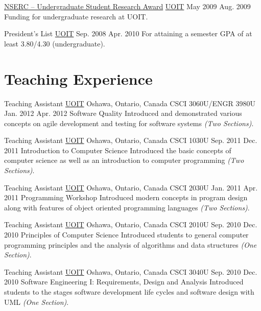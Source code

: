   \academicAwardsEntry
    {\href{http://www.nserc-crsng.gc.ca/students-etudiants/ug-pc/usra-brpc_eng.asp}{NSERC -- Undergraduate Student Research Award}}
    {\href{http://uoit.ca/}{UOIT}}
    {May 2009}
    {Aug. 2009}
    {Funding for undergraduate research at UOIT.}

  \academicAwardsEntry
    {President's List}
    {\href{http://uoit.ca/}{UOIT}}
    {Sep. 2008}
    {Apr. 2010}
    {For attaining a semester GPA of at least 3.80/4.30 (undergraduate).}

  \section{Teaching Experience}

  \teachingEntry
    {Teaching Assistant}
    {\href{http://www.uoit.ca/}{UOIT}}
    {Oshawa, Ontario, Canada}
    {CSCI 3060U/ENGR 3980U}
    {Jan. 2012}
    {Apr. 2012}
    {Software Quality}
    {Introduced and demonstrated various concepts on agile development and testing for software systems \textit{(Two Sections)}.}

  \teachingEntry
    {Teaching Assistant}
    {\href{http://www.uoit.ca/}{UOIT}}
    {Oshawa, Ontario, Canada}
    {CSCI 1030U}
    {Sep. 2011}
    {Dec. 2011}
    {Introduction to Computer Science}
    {Introduced the basic concepts of computer science as well as an introduction to computer programming \textit{(Two Sections)}.}

  \teachingEntry
    {Teaching Assistant}
    {\href{http://www.uoit.ca/}{UOIT}}
    {Oshawa, Ontario, Canada}
    {CSCI 2030U}
    {Jan. 2011}
    {Apr. 2011}
    {Programming Workshop}
    {Introduced modern concepts in program design along with features of object oriented programming languages \textit{(Two Sections)}.}

  \teachingEntry
    {Teaching Assistant}
    {\href{http://www.uoit.ca/}{UOIT}}
    {Oshawa, Ontario, Canada}
    {CSCI 2010U}
    {Sep. 2010}
    {Dec. 2010}
    {Principles of Computer Science}
    {Introduced students to general computer programming principles and the analysis of algorithms and data structures \textit{(One Section)}.}

  \teachingEntry
    {Teaching Assistant}
    {\href{http://www.uoit.ca/}{UOIT}}
    {Oshawa, Ontario, Canada}
    {CSCI 3040U}
    {Sep. 2010}
    {Dec. 2010}
    {Software Engineering I: Requirements, Design and Analysis}
    {Introduced students to the stages software development life cycles and software design with UML \textit{(One Section)}.}

